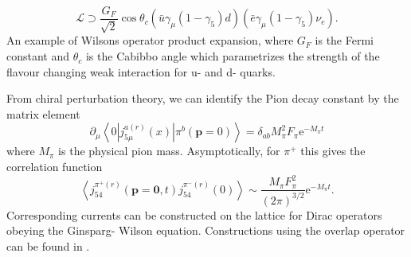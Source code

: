 \documentclass[a4paper,10pt]{article}
\begin{document}
\begin{equation}
\mathcal{L} \supset \frac{G_{F}}{\sqrt{2}} \cos \theta_{c}\left(\bar{u} \gamma_{\mu}\left(1-\gamma_{5}\right) d\right)\left(\bar{e} \gamma_{\mu}\left(1-\gamma_{5}\right) \nu_{e}\right).
\end{equation}
An example of Wilsons operator product expansion,
where $G_F$ is the Fermi constant and $\theta_c$ is the Cabibbo angle which parametrizes the strength of  the flavour changing weak interaction for u- and d- quarks. \par From chiral perturbation theory, we can identify the Pion decay constant by the matrix element 
\begin{equation}
\partial_{\mu}\left\langle 0\left|j_{5\mu}^{a(r)}(x)\right| \pi^{b}(\boldsymbol{p}=0)\right\rangle=\delta_{a b} M_{\pi}^{2} F_{\pi} \mathrm{e}^{-M_{\pi} t}
\end{equation}
where $M_\pi$ is the physical pion mass\cite{WeinbergSteven1979PL}\cite{gasser1985chiral}. Asymptotically, for $\pi^+$ this gives the correlation function
\begin{equation}\label{eq:decay_constant}
\left\langle j_{54}^{\pi^+(r)}(\boldsymbol{p}=\mathbf{0}, t) j_{54}^{\pi^-(r)}(0)\right\rangle \sim \frac{M_{\pi} F_{\pi}^{2}}{(2\pi)^{3/2}} \mathrm{e}^{-M_{\pi} t}.
\end{equation}
Corresponding currents can be constructed on the lattice for Dirac operators obeying the Ginsparg- Wilson equation. Constructions using the overlap operator can be found in \cite{hasenfratz1998lattice}\cite{kikukawa1999axial}. 
\end{document}
